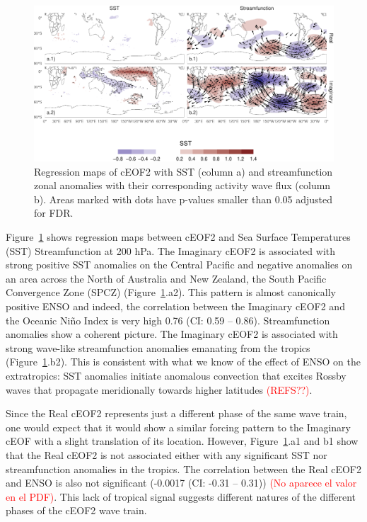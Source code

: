 \documentclass[smallextended]{svjour3}       %
\begin{document}
\begin{figure}
\includegraphics{../figures/sst-psi-2-1} \caption{Regression maps of cEOF2 with SST (column a) and streamfunction zonal anomalies with their corresponding activity wave flux (column b). Areas marked with dots have p-values smaller than 0.05 adjusted for FDR.}\label{fig:sst-psi-2}
\end{figure}

Figure~\ref{fig:sst-psi-2} shows regression maps between cEOF2 and Sea Surface Temperatures (SST) Streamfunction at 200 hPa. The Imaginary cEOF2 is associated with strong positive SST anomalies on the Central Pacific and negative anomalies on an area across the North of Australia and New Zealand, the South Pacific Convergence Zone (SPCZ) (Figure~\ref{fig:sst-psi-2}.a2). This pattern is almost canonically positive ENSO and indeed, the correlation between the Imaginary cEOF2 and the Oceanic Niño Index \citep{bamston1997} is very high 0.76 (CI: 0.59 -- 0.86). Streamfunction anomalies show a coherent picture. The Imaginary cEOF2 is associated with strong wave-like streamfunction anomalies emanating from the tropics (Figure~\ref{fig:sst-psi-2}.b2). This is consistent with what we know of the effect of ENSO on the extratropics: SST anomalies initiate anomalous convection that excites Rossby waves that propagate meridionally towards higher latitudes \textcolor{red}{(REFS??)}.

Since the Real cEOF2 represents just a different phase of the same wave train, one would expect that it would show a similar forcing pattern to the Imaginary cEOF with a slight translation of its location. However, Figure~\ref{fig:sst-psi-2}.a1 and b1 show that the Real cEOF2 is not associated either with any significant SST nor streamfunction anomalies in the tropics. The correlation between the Real cEOF2 and ENSO is also not significant (-0.0017 (CI: -0.31 -- 0.31)) \textcolor{red}{(No aparece el valor en el PDF)}. This lack of tropical signal suggests different natures of the different phases of the cEOF2 wave train.
\end{document}
